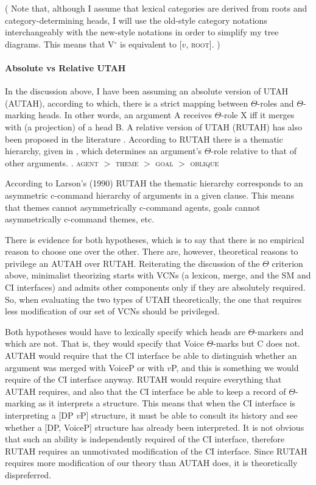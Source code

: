 \documentclass[letterpaper,12pt]{article}
\begin{document}
(
Note that, although I assume that lexical categories are derived from roots and category-determining heads, I will use the old-style category notations interchangeably with the new-style notations in order to simplify my tree diagrams.
This means that V$^\circ$ is equivalent to [$v$, \textsc{root}].
)

\paragraph{Absolute vs Relative UTAH}
In the discussion above, I have been assuming an absolute version of UTAH (AUTAH), according to which, there is a strict mapping between $\Theta$-roles and $\Theta$-marking heads.
In other words, an argument A receives $\Theta$-role X iff it merges with (a projection) of a head B.
A relative version of UTAH (RUTAH) has also been proposed in the literature \parencite[][\textit{inter alia}]{larson1990double}.
According to RUTAH there is a thematic hierarchy, given in \Next, which determines an argument's $\Theta$-role relative to that of other arguments.
\ex. \textsc{agent} $>$ \textsc{theme} $>$ \textsc{goal} $>$ \textsc{oblique} \parencite{larson1990double}

According to Larson's (1990) RUTAH the thematic hierarchy corresponds to an asymmetric c-command hierarchy of arguments in a given clause.
This means that themes cannot asymmetrically c-command agents, goals cannot asymmetrically c-command themes, etc.

There is evidence for both hypotheses, which is to say that there is no empirical reason to choose one over the other.
There are, however, theoretical reasons to privilege an AUTAH over RUTAH.
Reiterating the discussion of the $\Theta$ criterion above, minimalist theorizing starts with VCNs (a lexicon, merge, and the SM and CI interfaces) and admits other components only if they are absolutely required.
So, when evaluating the two types of UTAH theoretically, the one that requires less modification of our set of VCNs should be privileged.

Both hypotheses would have to lexically specify which heads are $\Theta$-markers and which are not.
That is, they would specify that Voice $\Theta$-marks but C does not.
AUTAH would require that the CI interface be able to distinguish whether an argument was merged with VoiceP or with $v$P, and this is something we would require of the CI interface anyway.
RUTAH would require everything that AUTAH requires, and also that the CI interface be able to keep a record of $\Theta$-marking as it interprets a structure.
This means that when the CI interface is interpreting a [DP $v$P] structure, it must be able to consult its history and see whether a [DP, VoiceP] structure has already been interpreted.
It is not obvious that such an ability is independently required of the CI interface, therefore RUTAH requires an unmotivated modification of the CI interface.
Since RUTAH requires more modification of our theory than AUTAH does, it is theoretically dispreferred.
\end{document}
